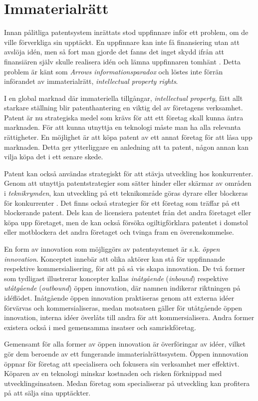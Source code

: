 \section{Immaterialrätt}
\label{sec:ip}

Innan pålitliga patentsystem inrättats stod uppfinnare inför ett problem, om de ville förverkliga sin upptäckt.
En uppfinnare kan inte få finansiering utan att avslöja idén, men så fort man gjorde det fanns det inget skydd ifrån att finansiären själv skulle realisera idén och lämna uppfinnaren tomhänt \cite{nard}.
Detta problem är känt som \emph{Arrows informationsparadox}\cite{arrow} och löstes inte förrän införandet av immaterialrätt, \emph{intellectual property rights}.

I en global marknad där immateriella tillgångar, \emph{intellectual property}, fått allt starkare ställning blir patenthantering en viktig del av företagens verksamhet\cite{ove}.
Patent är nu strategiska medel som krävs för att ett företag skall kunna äntra marknaden.
För att kunna utnyttja en teknologi måste man ha alla relevanta rättigheter.
En möjlighet är att köpa patent av ett annat företag för att låsa upp marknaden.
Detta ger ytterliggare en anledning att ta patent, någon annan kan vilja köpa det i ett senare skede.

Patent kan också användas strategiskt för att stävja utveckling hos konkurrenter.
Genom att utnyttja patentstrategier som sätter hinder eller skärmar av områden i \emph{teknikrymden}, kan utveckling på ett teknikområde göras dyrare eller blockeras för konkurrenter \cite{ove}. Det finns också strategier för ett företag som träffar på ett blockerande patent. Dels kan de licensiera patentet från det andra företaget eller köpa upp företaget, men de kan också försöka ogiltigförklara patentet i domstol eller motblockera det andra företaget och tvinga fram en överenskommelse\cite{ove}. 

En form av innovation som möjliggörs av patentsystemet är s.k. \emph{öppen innovation}.
Konceptet innebär att olika aktörer kan stå för uppfinnande respektive kommersialisering, för att på så vis skapa innovation.
De två former som tydligast illustrerar koncepter kallas \emph{inåtgående} (\emph{inbound}) respektive \emph{utåtgående} (\emph{outbound}) öppen innovation, där namnen indikerar riktningen på idéflödet.
Inåtgående öppen innovation praktiseras genom att externa idéer förvärvas och kommersialiseras, medan motsatsen gäller för utåtgående öppen innovation, interna idéer överlåts till andra för att kommersialisera.
Andra former existera också i med gemensamma insatser och samriskföretag.

Gemensamt för alla former av öppen innovation är överföringar av idéer, vilket gör dem beroende av ett fungerande immaterialrättssystem.
Öppen innnovation öppnar för företag att specialisera och fokusera sin verksamhet mer effektivt.
Köparen av en teknologi minskar kostnaden och risken förknippad med utvecklingsinsatsen. 
Medan företag som specialiserar på utveckling kan profitera på att sälja sina upptäckter.
